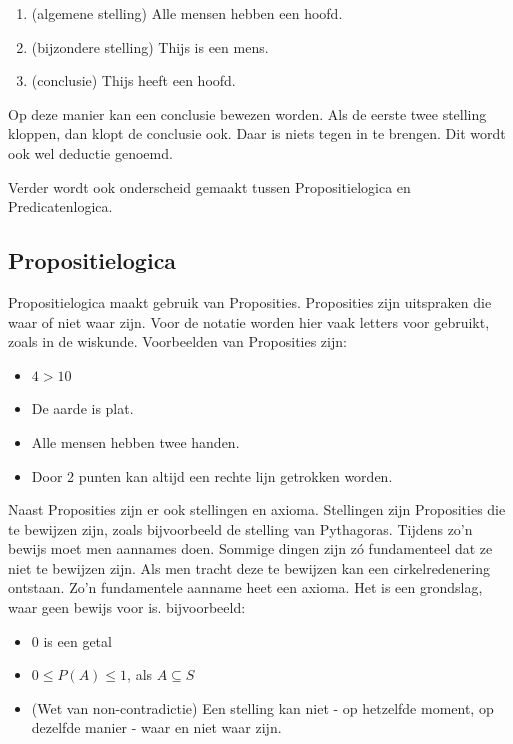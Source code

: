 \documentclass{article}
\begin{document}
	\begin{enumerate}
		\item (algemene stelling) Alle mensen hebben een hoofd.
		\item (bijzondere stelling) Thijs is een mens.
		\item (conclusie) Thijs heeft een hoofd.
	\end{enumerate}

	Op deze manier kan een conclusie bewezen worden. Als de eerste twee stelling kloppen, dan klopt de conclusie ook. Daar is niets tegen in te brengen. Dit wordt ook wel deductie genoemd.

	Verder wordt ook onderscheid gemaakt tussen Propositielogica en Predicatenlogica.
	
		\subsection{Propositielogica}
		
		Propositielogica maakt gebruik van Proposities. Proposities zijn uitspraken die waar of niet waar zijn. Voor de notatie worden hier vaak letters voor gebruikt, zoals in de wiskunde. Voorbeelden van Proposities zijn:

		\begin{itemize}
			\item \( 4 > 10 \)
			\item De aarde is plat.
			\item Alle mensen hebben twee handen.
			\item Door 2 punten kan altijd een rechte lijn getrokken worden.
		\end{itemize}

		Naast Proposities zijn er ook stellingen en axioma. Stellingen zijn Proposities die te bewijzen zijn, zoals bijvoorbeeld de stelling van Pythagoras. Tijdens zo'n bewijs moet men aannames doen. Sommige dingen zijn zó fundamenteel dat ze niet te bewijzen zijn. Als men tracht deze te bewijzen kan een cirkelredenering ontstaan. Zo'n fundamentele aanname heet een axioma. Het is een grondslag, waar geen bewijs voor is. bijvoorbeeld:

		\begin{itemize}
			\item 0 is een getal
			\item \( 0 \leq P(A) \leq 1 \), als \( A \subseteq S \)
			\item (Wet van non-contradictie) Een stelling kan niet - op hetzelfde moment, op dezelfde manier - waar en niet waar zijn.
		\end{itemize}
		
\end{document}

